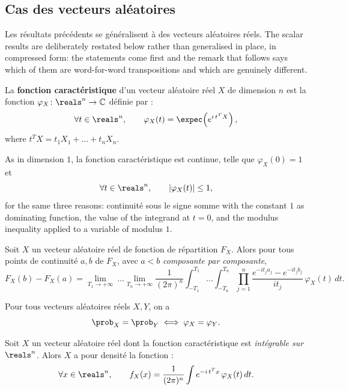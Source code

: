 \subsection{Cas des vecteurs aléatoires}

Les résultats précédents se généralisent à des vecteurs aléatoires réels. The scalar results
are deliberately restated below rather than generalised in place, in compressed form: the
statements come first and the remark that follows says which of them are word-for-word
transpositions and which are genuinely different.

\begin{definition}
La \textbf{fonction caractéristique} d'un vecteur aléatoire réel $X$ de dimension $n$ est la
fonction $\varphi_{X} \colon \reals^{n} \to \mathbb{C}$ définie par :
\[
  \forall t \in \reals^{n}, \qquad \varphi_{X}(t) =
  \expec\!\left(e^{i\,t^{T}X}\right),
\]
where $t^{T}X = t_{1}X_{1} + \dots + t_{n}X_{n}$.
\end{definition}

As in dimension $1$, la fonction caractéristique est continue, telle que $\varphi_{X}(0) =
1$ et
\[
  \forall t \in \reals^{n}, \qquad \left|\varphi_{X}(t)\right| \leq 1,
\]
for the same three reasons: continuité sous le signe somme with the constant $1$ as
dominating function, the value of the integrand at $t = 0$, and the modulus inequality
applied to a variable of modulus $1$.

\begin{theorem}
Soit $X$ un vecteur aléatoire réel de fonction de répartition $F_{X}$. Alors pour tous points
de continuité $a, b$ de $F_{X}$, avec $a < b$ \emph{composante par composante},
\[
  F_{X}(b) - F_{X}(a) = \lim_{T_{1} \to +\infty}\ \dots \lim_{T_{n} \to +\infty}
  \frac{1}{(2\pi)^{n}}\int_{-T_{1}}^{T_{1}}\!\!\dots\int_{-T_{n}}^{T_{n}}
  \prod_{j=1}^{n}\frac{e^{-it_{j}a_{j}} - e^{-it_{j}b_{j}}}{it_{j}}\, \varphi_{X}(t)\,dt.
\]
\end{theorem}

\begin{corollary}
Pour tous vecteurs aléatoires réels $X, Y$, on a
\[
  \prob_{X} = \prob_{Y} \iff \varphi_{X} = \varphi_{Y}.
\]
\end{corollary}

\begin{corollary}
Soit $X$ un vecteur aléatoire réel dont la fonction caractéristique est \emph{intégrable sur
$\reals^{n}$}. Alors $X$ a pour densité la fonction :
\[
  \forall x \in \reals^{n}, \qquad f_{X}(x) = \frac{1}{(2\pi)^{n}}\int
  e^{-i\,t^{T}x}\,\varphi_{X}(t)\,dt.
\]
\end{corollary}


